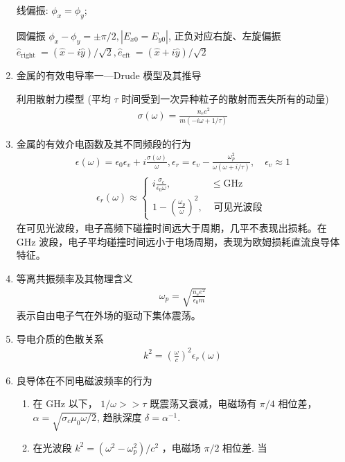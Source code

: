 \documentclass[../../note.tex]{subfiles}
\begin{document}
\begin{enumerate}
	
	线偏振: $\phi_x=\phi_y$;
	
	圆偏振 $\phi_x-\phi_y= \pm \pi / 2,\left|E_{x 0}=E_{y 0}\right|$, 正负对应右旋、左旋偏振 $\hat{e}_{\text {right }}=(\hat{x}-i \hat{y}) / \sqrt{2}, \hat{e}_{\text {eft }}=(\hat{x}+i \hat{y}) / \sqrt{2}$
	
	\item 金属的有效电导率一—Drude 模型及其推导
	
	利用散射力模型 (平均 $\tau$ 时间受到一次异种粒子的散射而丟失所有的动量)
	\begin{align}
	\sigma(\omega)=\frac{n_e e^2}{m(-i \omega+1 / \tau)}
	\end{align}
	\item 金属的有效介电函数及其不同频段的行为
	\begin{align}
	\epsilon(\omega)=\epsilon_0 \epsilon_v+i \frac{\sigma(\omega)}{\omega}, \epsilon_r=\epsilon_v-\frac{\omega_p^2}{\omega(\omega+i / \tau)}, \quad \epsilon_v \approx 1
	\end{align}
	\begin{align}
	\epsilon_r(\omega) \approx \begin{cases}i \frac{\sigma_c}{\epsilon_0 \omega}, & \leq \mathrm{GHz} \\ 1-\left(\frac{\omega_p}{\omega}\right)^2, & \text { 可见光波段 }\end{cases}
	\end{align}
	在可见光波段，电子高频下碰撞时间远大于周期，几平不表现出损耗。在 $\mathrm{GHz}$ 波段，电子平均碰撞时间远小于电场周期，表现为欧姆损耗直流良导体特征。
	\item 等离共振频率及其物理含义
	\begin{align}
	\omega_p=\sqrt{\frac{n_e e^2}{\epsilon_0 m}}
	\end{align}
	表示自由电子气在外场的驱动下集体震荡。

	\item 导电介质的色散关系
	\begin{align}
	k^2=\left(\frac{\omega}{c}\right)^2 \epsilon_r(\omega)
	\end{align}
	\item 良导体在不同电磁波频率的行为
	\begin{enumerate}
		\item 在 $\mathrm{GHz}$ 以下， $1 / \omega>>\tau$ 既震荡又衰减，电磁场有 $\pi / 4$ 相位差， $\alpha=\sqrt{\sigma_c \mu_0 \omega / 2}$, 趋肤深度 $\delta=\alpha^{-1}$.
		\item  在光波段 $k^2=\left(\omega^2-\omega_p^2\right) / c^2$ ，电磁场 $\pi / 2$ 相位差. 当
		

\end{enumerate}
\end{enumerate}
\end{document}
